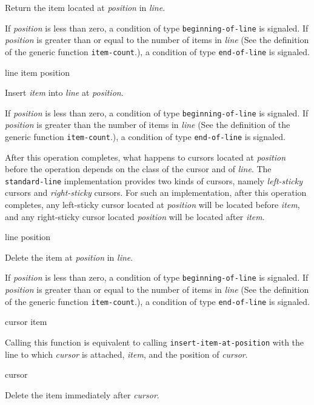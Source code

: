 Return the item located at \textit{position} in \textit{line}.

If \textit{position} is less than zero, a condition of type
\texttt{beginning-of-line} is signaled.  If \textit{position} is
greater than or equal to the number of items in \textit{line} (See the
definition of the generic function \texttt{item-count}.), a condition
of type \texttt{end-of-line} is signaled.

 {line item position}

Insert \textit{item} into \textit{line} at \textit{position}.

If \textit{position} is less than zero, a condition of type
\texttt{beginning-of-line} is signaled.  If \textit{position} is
greater than the number of items in \textit{line} (See the definition
of the generic function \texttt{item-count}.), a condition of type
\texttt{end-of-line} is signaled.

After this operation completes, what happens to cursors located at
\textit{position} before the operation depends on the class of the
cursor and of \textit{line}.  The \texttt{standard-line}
implementation provides two kinds of cursors, namely
\emph{left-sticky} cursors and \emph{right-sticky} cursors.  For such
an implementation, after this operation completes, any left-sticky
cursor located at \textit{position} will be located before
\textit{item}, and any right-sticky cursor located \textit{position}
will be located after \textit{item}.

 {line position}

Delete the item at \textit{position} in \textit{line}.

If \textit{position} is less than zero, a condition of type
\texttt{beginning-of-line} is signaled.  If \textit{position} is
greater than or equal to the number of items in \textit{line} (See the
definition of the generic function \texttt{item-count}.), a condition
of type \texttt{end-of-line} is signaled.

 {cursor item}

Calling this function is equivalent to calling
\texttt{insert-item-at-position} with the line to which
\textit{cursor} is attached, \textit{item}, and the position of
\textit{cursor}.  \howeverperformance{}

\ifdetached{}

 {cursor}

Delete the item immediately after \emph{cursor}.

